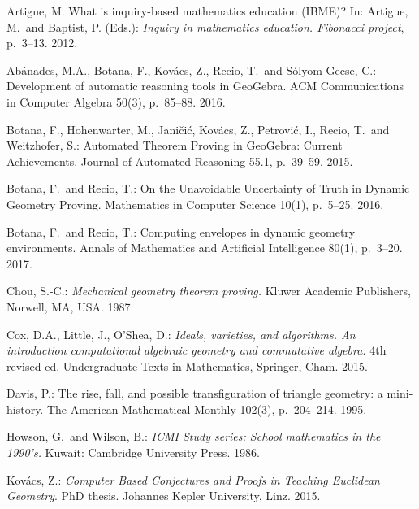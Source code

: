 \begin{thebibliography}{10}

Artigue, M. What is inquiry-based mathematics education (IBME)?
In: Artigue, M.~and Baptist, P. (Eds.): \textit{Inquiry in mathematics education.
Fibonacci project}, p.~3--13. 2012.

Ab\'anades, M.A., Botana, F., Kov\'acs, Z., Recio, T.~and S\'olyom-Gecse, C.:
Development of automatic reasoning tools in GeoGebra.
ACM Communications in Computer Algebra 50(3), p.~85--88.
2016.

Botana, F., Hohenwarter, M., Jani\v{c}i\'c, Kov\'acs, Z., Petrovi\'c, I.,
Recio, T.~and Weitzhofer, S.: Automated Theorem Proving in GeoGebra: Current
Achievements. Journal of Automated Reasoning 55.1, p.~39--59. 2015.

Botana, F.~and Recio, T.: On the Unavoidable Uncertainty of Truth in Dynamic Geometry Proving.
Mathematics in Computer Science 10(1), p.~5--25. 2016.

Botana, F.~and Recio, T.:
Computing envelopes in dynamic geometry environments.
Annals of Mathematics and Artificial Intelligence 80(1), p.~3--20.
2017.

Chou, S.-C.: \textit{Mechanical geometry theorem proving.} Kluwer Academic Publishers,
Norwell, MA, USA. 1987.

Cox, D.A., Little, J., O'Shea, D.: \textit{Ideals, varieties, and algorithms.
An introduction computational algebraic geometry and commutative algebra.}
4th revised ed. Undergraduate Texts in Mathematics, Springer, Cham. 2015.

Davis, P.: The rise, fall, and possible transfiguration of triangle geometry: a mini-history.
The American Mathematical Monthly 102(3), p.~204--214. 1995.

Howson, G.~and Wilson, B.:
\textit{ICMI Study series: School mathematics in the 1990's.} Kuwait: Cambridge University Press. 1986.

Kov\'acs, Z.: \textit{Computer Based Conjectures and Proofs in Teaching Euclidean Geometry}.
PhD thesis. Johannes Kepler University, Linz. 2015.


\end{thebibliography}
